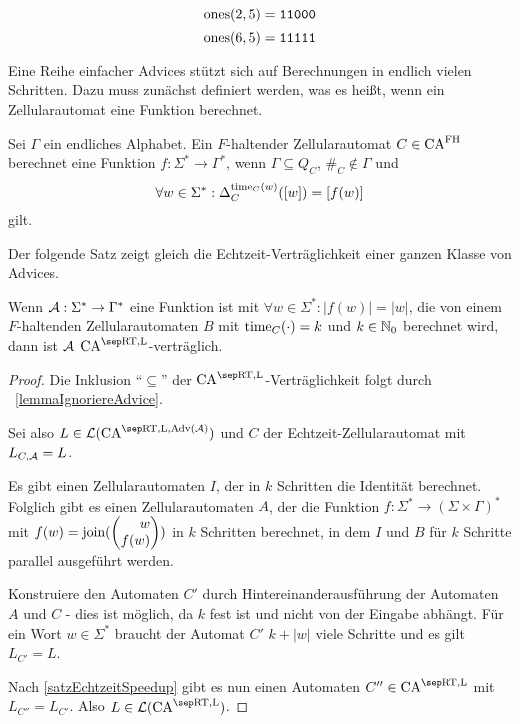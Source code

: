 \begin{exmp}
    \[
        \mathrm{ones}(2, 5) = \texttt{11000}
    \]
    \[
        \mathrm{ones}(6, 5) = \texttt{11111}
    \]        
\end{exmp}

Eine Reihe einfacher Advices stützt sich auf Berechnungen in endlich vielen Schritten.
Dazu muss zunächst definiert werden, was es heißt, wenn ein Zellularautomat eine Funktion berechnet.
\begin{definition}
    Sei $\Gamma$ ein endliches Alphabet.
    Ein $F$-haltender Zellularautomat $C \in \textrm{CA}^{\textrm{FH}}$ berechnet eine Funktion $f: \Sigma^* \to \Gamma^*$, wenn
    $\Gamma \subseteq Q_C$, $\#_C \not\in \Gamma$ und 
    \[
        \forall w \in \Sigma^*: \Delta^{\operatorname{time}_C(w)}_{C}([w]) = [f(w)]
    \]
    gilt.
\end{definition}

Der folgende Satz zeigt gleich die Echtzeit-Verträglichkeit einer ganzen Klasse von Advices.
\begin{satz}
    \label{lemmaEinfachesOrakel}
    Wenn $\mathcal{A}: \Sigma^* \to \Gamma^*$ eine Funktion ist mit $\forall w \in \Sigma^*: |f(w)| = |w|$,
    die von einem $F$-haltenden Zellularautomaten $B$ mit
    $\operatorname{time}_C(\cdot) = k$ und $k \in \mathbb{N}_0$ berechnet wird,
    dann ist $\mathcal{A}$ $\CAM{\CART, \CALeft}$-verträglich.
\end{satz}
\begin{proof}
    Die Inklusion \enquote{$\subseteq$} der $\CAM{\CART, \CALeft}$-Verträglichkeit folgt durch ~\cref{lemmaIgnoriereAdvice}.
    
    Sei also $L \in \CAL{\CART, \CALeft, \orakel({\advA})}$ und $C$
    der Echtzeit-Zellularautomat mit $L_{C, \mathcal{A}} = L$.
    
    Es gibt einen Zellularautomaten $I$, der in $k$ Schritten die Identität berechnet. Folglich gibt es einen Zellularautomaten $A$, der die Funktion $f: \Sigma^* \to (\Sigma \times \Gamma)^*$ mit
    $f(w) = \joinw(\Spvek{w; f(w)})$ in $k$ Schritten berechnet, in dem $I$ und $B$ für $k$ Schritte parallel ausgeführt werden.
    
    Konstruiere den Automaten $C'$ durch Hintereinanderausführung der Automaten $A$ und $C$ - dies ist möglich, da $k$ fest ist und nicht von der Eingabe abhängt.
    Für ein Wort $w \in \Sigma^*$ braucht der Automat $C'$ $k + |w|$ viele Schritte und es gilt $L_{C'} = L$.
    
    Nach \cref{satzEchtzeitSpeedup} gibt es nun einen Automaten $C'' \in \CAM{\CART, \CALeft}$
    mit $L_{C''} = L_{C'}$.
    Also $L \in \CAL{\CART, \CALeft}$.
\end{proof}

